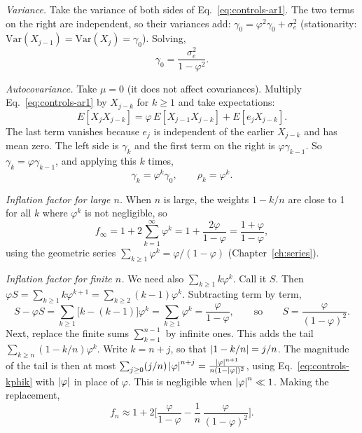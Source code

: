 \emph{Variance.} Take the variance of both sides of Eq.~\eqref{eq:controls-ar1}. The two terms on the right are independent, so their variances add: $\gamma_0=\varphi^2\gamma_0+\sigma_e^2$ (stationarity: $\mathrm{Var}(X_{j-1})=\mathrm{Var}(X_j)=\gamma_0$). Solving,
\begin{equation}
\gamma_0=\frac{\sigma_e^2}{1-\varphi^2}.
\label{eq:controls-ar1var}
\end{equation}

\emph{Autocovariance.} Take $\mu=0$ (it does not affect covariances). Multiply Eq.~\eqref{eq:controls-ar1} by $X_{j-k}$ for $k\ge1$ and take expectations:
\begin{equation}
E[X_jX_{j-k}]=\varphi\,E[X_{j-1}X_{j-k}]+E[e_jX_{j-k}].
\end{equation}
The last term vanishes because $e_j$ is independent of the earlier $X_{j-k}$ and has mean zero. The left side is $\gamma_k$ and the first term on the right is $\varphi\gamma_{k-1}$. So $\gamma_k=\varphi\gamma_{k-1}$, and applying this $k$ times,
\begin{equation}
\gamma_k=\varphi^k\gamma_0,\qquad\rho_k=\varphi^k.
\label{eq:controls-ar1rho}
\end{equation}

\emph{Inflation factor for large $n$.} When $n$ is large, the weights $1-k/n$ are close to 1 for all $k$ where $\varphi^k$ is not negligible, so
\begin{equation}
f_\infty=1+2\sum_{k=1}^\infty\varphi^k=1+\frac{2\varphi}{1-\varphi}=\frac{1+\varphi}{1-\varphi},
\label{eq:controls-finf}
\end{equation}
using the geometric series $\sum_{k\ge1}\varphi^k=\varphi/(1-\varphi)$ (Chapter~\ref{ch:series}).

\emph{Inflation factor for finite $n$.} We need also $\sum_{k\ge1}k\varphi^k$. Call it $S$. Then $\varphi S=\sum_{k\ge1}k\varphi^{k+1}=\sum_{k\ge2}(k-1)\varphi^k$. Subtracting term by term,
\begin{equation}
S-\varphi S=\sum_{k\ge1}\big[k-(k-1)\big]\varphi^k=\sum_{k\ge1}\varphi^k=\frac{\varphi}{1-\varphi},
\qquad\text{so}\qquad S=\frac{\varphi}{(1-\varphi)^2}.
\label{eq:controls-kphik}
\end{equation}
Next, replace the finite sums $\sum_{k=1}^{n-1}$ by infinite ones. This adds the tail $\sum_{k\ge n}(1-k/n)\varphi^k$. Write $k=n+j$, so that $\left\lvert 1-k/n\right\rvert=j/n$. The magnitude of the tail is then at most $\sum_{j\ge0}(j/n)\left\lvert \varphi\right\rvert^{n+j}=\frac{\left\lvert \varphi\right\rvert^{n+1}}{n(1-\left\lvert \varphi\right\rvert)^2}$, using Eq.~\eqref{eq:controls-kphik} with $\left\lvert \varphi\right\rvert$ in place of $\varphi$. This is negligible when $\left\lvert \varphi\right\rvert^n\ll1$. Making the replacement,
\begin{equation}
f_n\approx1+2\Big[\frac{\varphi}{1-\varphi}-\frac1n\,\frac{\varphi}{(1-\varphi)^2}\Big].
\label{eq:controls-fn}
\end{equation}

